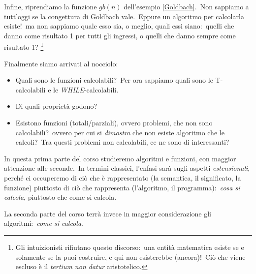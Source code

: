 Infine, riprendiamo la funzione $gb(n)$ dell'esempio \ref{Goldbach}.\
Non sappiamo a tutt'oggi se la congettura di Goldbach vale.\
Eppure un algoritmo per calcolarla esiste!\ ma non sappiamo quale esso sia, o meglio, quali essi siano:\ quelli che danno come risultato 1 per tutti gli ingressi, o quelli che danno sempre come risultato 1? \footnote{Gli intuizionisti rifiutano questo discorso:\ una entità matematica esiste se e solamente se la puoi costruire, e qui non esisterebbe (ancora)!\ Ciò che viene escluso è il \textit{tertium non datur} aristotelico.}

\medskip
\noindent Finalmente siamo arrivati al nocciolo:\

\begin{itemize}
    \item Quali sono le funzioni calcolabili?\ Per ora sappiamo quali sono le T-calcolabili e le \textit{\footnotesize WHILE}-calcolabili.
    \item Di quali proprietà godono?
    \item Esistono funzioni (totali/parziali), ovvero problemi, che non sono calcolabili?\ ovvero per cui si \textit{dimostra} che non esiste algoritmo che le calcoli?\ Tra questi problemi non calcolabili, ce ne sono di interessanti?
\end{itemize}

\noindent In questa prima parte del corso studieremo algoritmi e funzioni, con maggior attenzione alle seconde.\
In termini classici, l'enfasi sarà sugli aspetti \textit{estensionali}, perché ci occuperemo di ciò che è rappresentato (la semantica, il significato, la funzione) piuttosto di ciò che rappresenta (l'algoritmo, il programma):\ \textit{cosa si calcola}, piuttosto che come si calcola.\

La seconda parte del corso terrà invece in maggior considerazione gli algoritmi:\ \textit{come si calcola}.
